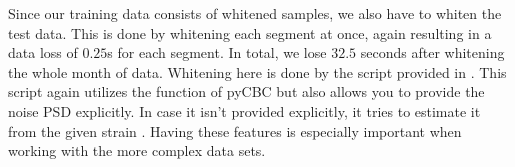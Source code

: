 Since our training data consists of whitened samples, we also have to whiten the
test data. This is done by whitening each segment at once, again resulting in a
data loss of $0.25$s for each segment. In total, we lose $32.5$ seconds after
whitening the whole month of data. Whitening here is done by the 
script provided in \cite{MLGWSC1}. This script again utilizes the 
function of pyCBC but also allows you to provide the noise PSD explicitly. In
case it isn't provided explicitly, it tries to estimate it from the given strain
. Having these features is especially important when working with the more
complex data sets.

